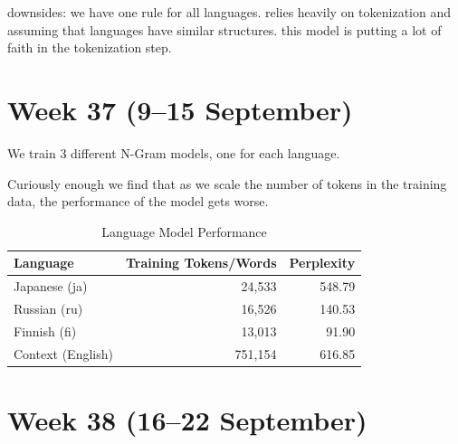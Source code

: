 \documentclass[11pt]{article}
\begin{document}
\begin{enumerate}
    downsides:
        we have one rule for all languages. relies heavily on tokenization and assuming that languages have similar structures.
        this model is putting a lot of faith in the tokenization step.

\end{enumerate}

\section{Week 37 (9--15 September)}

We train 3 different N-Gram models, one for each language.

Curiously enough we find that as we scale the number of tokens in the training data, the performance of the model gets worse.

\begin{table}[ht]
    \centering
    \begin{tabular}{|l|r|r|}
        \hline
        Language & Training Tokens/Words & Perplexity \\
        \hline
        Japanese (ja) & 24,533 & 548.79 \\
        Russian (ru) & 16,526 & 140.53 \\
        Finnish (fi) & 13,013 & 91.90 \\
        Context (English) & 751,154 & 616.85 \\
        \hline
    \end{tabular}
    \caption{Language Model Performance}
    \label{tab:language_model_performance}
\end{table}



\section{Week 38 (16--22 September)}
\end{document}
